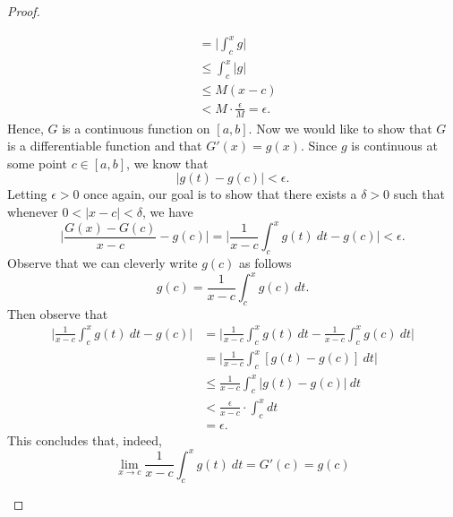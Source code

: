\begin{proof}
\begin{enumerate}
\begin{align*}
									 &= \Big| \int_{ c }^{ x } g  \Big| \\
									 &\leq \int_{ c }^{ x } | g |  \\
									 &\leq M (x - c )  \\
									 &< M \cdot \frac{ \epsilon  }{ M  } = \epsilon.
		\end{align*}
		Hence, \( G  \) is a continuous function on \( [a,b]  \). Now we would like to show that \( G  \) is a differentiable function and that \( G'(x) = g(x)  \). Since \( g  \) is continuous at some point \( c \in [a,b]  \), we know that 
		\[  | g(t) - g(c)  | < \epsilon. \] Letting \( \epsilon > 0   \) once again, our goal is to show that there exists a \( \delta > 0   \) such that whenever \(0  < | x  -c  |  < \delta \), we have
		\[  \Big| \frac{ G(x) - G(c)  }{ x  -c  } - g(c)  \Big| = \Big| \frac{ 1 }{ x - c  } \int_{ c }^{ x } g(t) \ dt - g(c) \Big|  < \epsilon. \]
	Observe that we can cleverly write \( g(c)  \) as follows	
	\[  g(c) = \frac{ 1 }{ x -c  } \int_{ c }^{ x } g(c) \  dt. \] Then observe that 
	\begin{align*}
	    \Big| \frac{ 1 }{ x -c  } \int_{ c }^{ x } g(t) \  dt - g(c)  \Big| &= \Big| \frac{ 1 }{ x -c  } \int_{ c }^{ x } g(t)  \ dt - \frac{ 1 }{ x -c  } \int_{ c }^{ x } g(c) \   dt \Big|  \\
																			&= \Big| \frac{ 1 }{ x -c  } \int_{ c }^{ x } [ g(t) - g(c) ] \ dt \Big| \\
																			&\leq \frac{ 1 }{ x -c  } \int_{ c }^{ x } | g(t) - g(c) | \  dt \\
																			&< \frac{ \epsilon  }{ x- c  } \cdot \int_{ c }^{ x } dt  \\ 
																			&= \epsilon.
	\end{align*}
	This concludes that, indeed, 
	\[  \lim_{ x \to c } \frac{ 1 }{x -c  } \int_{ c }^{ x } g(t) \ dt = G'(c) = g(c) \]
\end{enumerate}
\end{proof}


